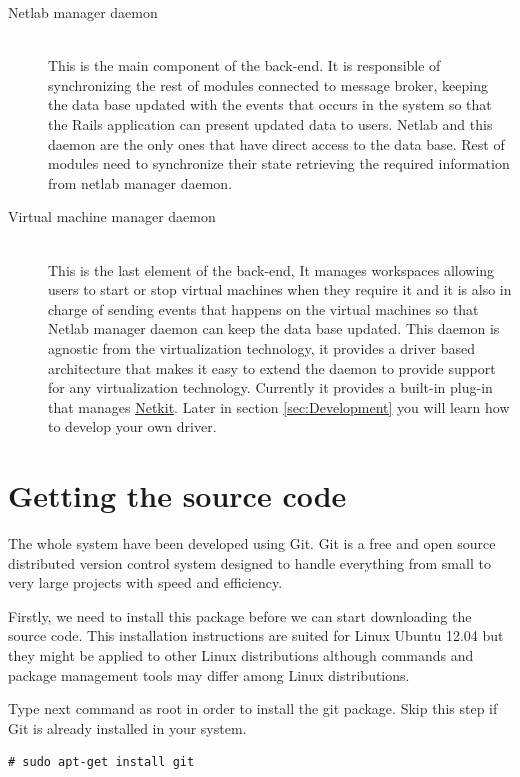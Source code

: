 \documentclass{article}
\begin{document}
\begin{description}
\item[Netlab manager daemon] \hfill \\
This is the main component of the back-end. It is responsible of synchronizing the rest of modules connected to message broker, keeping the data base updated with the events that occurs in the system so that the Rails application can present updated data to users. Netlab and this daemon are the only ones that have direct access to the data base. Rest of modules need to synchronize their state retrieving the required information from netlab manager daemon.

\item[Virtual machine manager daemon] \hfill \\
This is the last element of the back-end, It manages workspaces allowing users to start or stop virtual machines when they require it and it is also in charge of sending events that happens on the virtual machines so that Netlab manager daemon can keep the data base updated. This daemon is agnostic from the virtualization technology, it provides a driver based architecture that makes it easy to extend the daemon to provide support for any virtualization technology. Currently it provides a built-in plug-in that manages \href{http://wiki.netkit.org}{Netkit}. Later in section \ref{sec:Development} you will learn how to develop your own driver.
\end{description}

\section{Getting the source code}
\label{sec:Source}
The whole system have been developed using Git. Git is a free and open source distributed version control system designed to handle everything from small to very large projects with speed and efficiency.

Firstly, we need to install this package before we can start downloading the source code. This installation instructions are suited for Linux Ubuntu 12.04 but they might be applied to other Linux distributions although commands and package management tools may differ among Linux distributions.

Type next command as root in order to install the git package. Skip this step if Git is already installed in your system.

\begin{verbatim}
# sudo apt-get install git
\end{verbatim}
\end{document}
